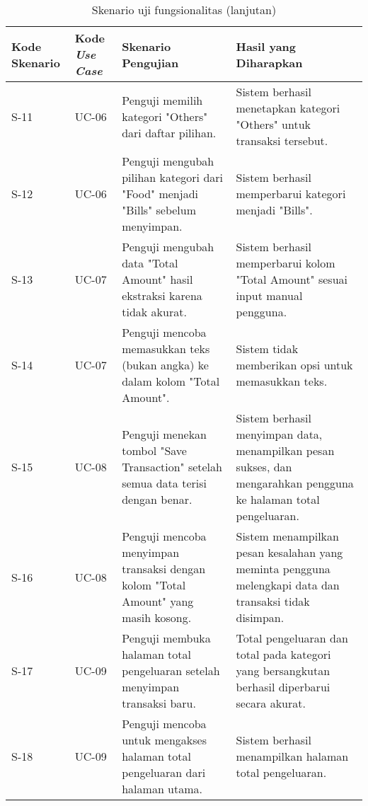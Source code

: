\begin{table}[h!]
\ContinuedFloat
\caption{Skenario uji fungsionalitas (lanjutan)}
\begin{tabularx}{\linewidth}{|p{1.5cm}|p{1.5cm}|p{4.5cm}|X|}
\hline
\textbf{Kode Skenario} & \textbf{Kode \emph{Use Case}} & \textbf{Skenario Pengujian} & \textbf{Hasil yang Diharapkan} \\
\hline
S-11 & UC-06 & Penguji memilih kategori "Others" dari daftar pilihan. & Sistem berhasil menetapkan kategori "Others" untuk transaksi tersebut. \\
\hline
S-12 & UC-06 & Penguji mengubah pilihan kategori dari "Food" menjadi "Bills" sebelum menyimpan. & Sistem berhasil memperbarui kategori menjadi "Bills". \\
\hline
S-13 & UC-07 & Penguji mengubah data "Total Amount" hasil ekstraksi karena tidak akurat. & Sistem berhasil memperbarui kolom "Total Amount" sesuai input manual pengguna. \\
\hline
S-14 & UC-07 & Penguji mencoba memasukkan teks (bukan angka) ke dalam kolom "Total Amount". & Sistem tidak memberikan opsi untuk memasukkan teks. \\
\hline
S-15 & UC-08 & Penguji menekan tombol "Save Transaction" setelah semua data terisi dengan benar. & Sistem berhasil menyimpan data, menampilkan pesan sukses, dan mengarahkan pengguna ke halaman total pengeluaran. \\
\hline
S-16 & UC-08 & Penguji mencoba menyimpan transaksi dengan kolom "Total Amount" yang masih kosong. & Sistem menampilkan pesan kesalahan yang meminta pengguna melengkapi data dan transaksi tidak disimpan. \\
\hline
S-17 & UC-09 & Penguji membuka halaman total pengeluaran setelah menyimpan transaksi baru. & Total pengeluaran dan total pada kategori yang bersangkutan berhasil diperbarui secara akurat. \\
\hline
S-18 & UC-09 & Penguji mencoba untuk mengakses halaman total pengeluaran dari halaman utama. & Sistem berhasil menampilkan halaman total pengeluaran. \\
\hline
\end{tabularx}
\end{table}

